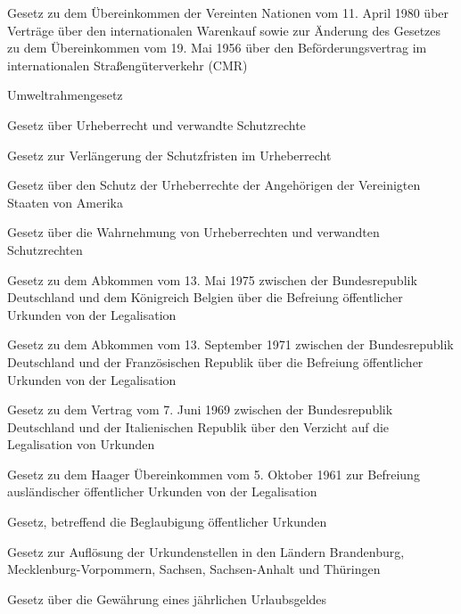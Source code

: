 \item[{UNWaVtrÜbkG}] Gesetz zu dem Übereinkommen der Vereinten Nationen vom 11. April 1980 über Verträge über den internationalen Warenkauf sowie zur Änderung des Gesetzes zu dem Übereinkommen vom 19. Mai 1956 über den Beförderungsvertrag im internationalen Straßengüterverkehr (CMR)

\item[{URaG}] Umweltrahmengesetz

\item[{UrhG}] Gesetz über Urheberrecht und verwandte Schutzrechte

\item[{UrhRSchFrVerlG}] Gesetz zur Verlängerung der Schutzfristen im Urheberrecht

\item[{UrhUSAG}] Gesetz über den Schutz der Urheberrechte der Angehörigen der Vereinigten Staaten von Amerika

\item[{UrhWahrnG}] Gesetz über die Wahrnehmung von Urheberrechten und verwandten Schutzrechten

\item[{UrkBefrBELG}] Gesetz zu dem Abkommen vom 13. Mai 1975 zwischen der Bundesrepublik Deutschland und dem Königreich Belgien über die Befreiung öffentlicher Urkunden von der Legalisation

\item[{UrkBefrFRAG}] Gesetz zu dem Abkommen vom 13. September 1971 zwischen der Bundesrepublik Deutschland und der Französischen Republik über die Befreiung öffentlicher Urkunden von der Legalisation

\item[{UrkBefrITAG}] Gesetz zu dem Vertrag vom 7. Juni 1969 zwischen der Bundesrepublik Deutschland und der Italienischen Republik über den Verzicht auf die Legalisation von Urkunden

\item[{UrkBefrÜbkG-Haag}] Gesetz zu dem Haager Übereinkommen vom 5. Oktober 1961 zur Befreiung ausländischer öffentlicher Urkunden von der Legalisation

\item[{UrkBeglG}] Gesetz, betreffend die Beglaubigung öffentlicher Urkunden

\item[{UrkStAuflG}] Gesetz zur Auflösung der Urkundenstellen in den Ländern Brandenburg, Mecklenburg-Vorpommern, Sachsen, Sachsen-Anhalt und Thüringen

\item[{UrlGG}] Gesetz über die Gewährung eines jährlichen Urlaubsgeldes

